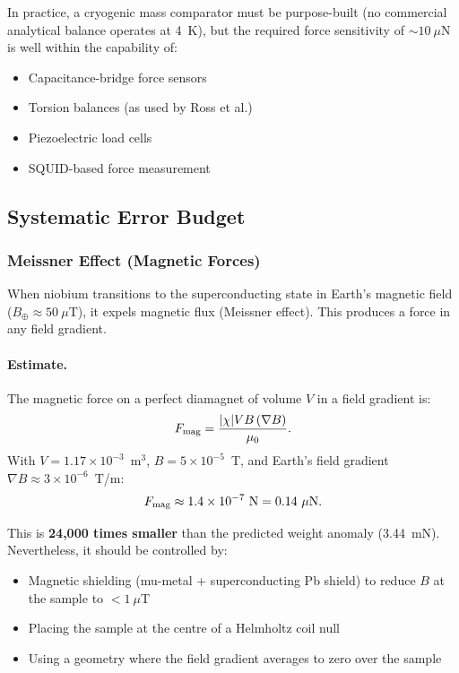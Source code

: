 \documentclass[12pt,a4paper]{article}
\theoremstyle{definition}
\theoremstyle{remark}
\begin{document}
In practice, a cryogenic mass comparator must be purpose-built (no commercial
analytical balance operates at 4~K), but the required force sensitivity of
$\sim 10~\mu$N is well within the capability of:
\begin{itemize}
\item Capacitance-bridge force sensors
\item Torsion balances (as used by Ross et al.)
\item Piezoelectric load cells
\item SQUID-based force measurement
\end{itemize}

\subsection{Systematic Error Budget}\label{sec:systematics}

\subsubsection{Meissner Effect (Magnetic Forces)}

When niobium transitions to the superconducting state in Earth's magnetic field
($B_\oplus \approx 50~\mu$T), it expels magnetic flux (Meissner effect).  This
produces a force in any field gradient.

\paragraph{Estimate.}
The magnetic force on a perfect diamagnet of volume $V$ in a field gradient is:
\begin{equation}
F_{\rm mag} = \frac{|\chi| V B \, (\nabla B)}{\mu_0}.
\end{equation}
With $V = 1.17 \times 10^{-3}$~m$^3$, $B = 5 \times 10^{-5}$~T, and
Earth's field gradient $\nabla B \approx 3 \times 10^{-6}$~T/m:
\begin{equation}
F_{\rm mag} \approx 1.4 \times 10^{-7}~\text{N} = 0.14~\mu\text{N}.
\end{equation}

This is \textbf{24,000 times smaller} than the predicted weight anomaly
(3.44~mN).  Nevertheless, it should be controlled by:
\begin{itemize}
\item Magnetic shielding (mu-metal + superconducting Pb shield) to reduce
$B$ at the sample to $< 1~\mu$T
\item Placing the sample at the centre of a Helmholtz coil null
\item Using a geometry where the field gradient averages to zero over the sample
\end{itemize}
\end{document}
